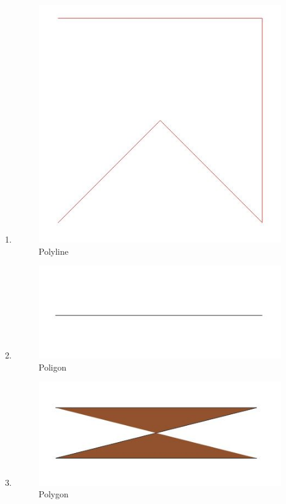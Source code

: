 \begin{enumerate}
	\item 
	
	\begin{figure}[H]
		\includegraphics[width=12cm]{figures/1174034/No5.JPG}
		\centering
		\caption{Polyline}
	\end{figure}
	
	\item 
	
	\begin{figure}[H]
		\includegraphics[width=12cm]{figures/1174034/No6.JPG}
		\centering
		\caption{Poligon}
	\end{figure}
	
	\item 
	
	\begin{figure}[H]
		\includegraphics[width=12cm]{figures/1174034/No7.JPG}
		\centering
		\caption{Polygon}
	\end{figure}
	

\end{enumerate}
